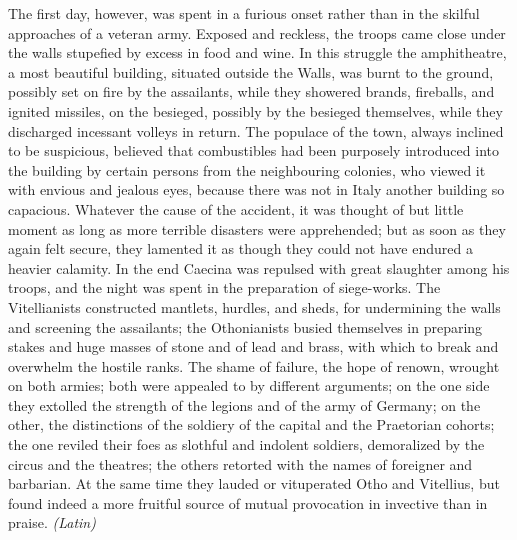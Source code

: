 
The first day, however, was spent in a furious onset rather than in the skilful approaches of a veteran army. Exposed and reckless, the troops came close under the walls stupefied by excess in food and wine. In this struggle the amphitheatre, a most beautiful building, situated outside the Walls, was burnt to the ground, possibly set on fire by the assailants, while they showered brands, fireballs, and ignited missiles, on the besieged, possibly by the besieged themselves, while they discharged incessant volleys in return. The populace of the town, always inclined to be suspicious, believed that combustibles had been purposely introduced into the building by certain persons from the neighbouring colonies, who viewed it with envious and jealous eyes, because there was not in Italy another building so capacious. Whatever the cause of the accident, it was thought of but little moment as long as more terrible disasters were apprehended; but as soon as they again felt secure, they lamented it as though they could not have endured a heavier calamity. In the end Caecina was repulsed with great slaughter among his troops, and the night was spent in the preparation of siege-works. The Vitellianists constructed mantlets, hurdles, and sheds, for undermining the walls and screening the assailants; the Othonianists busied themselves in preparing stakes and huge masses of stone and of lead and brass, with which to break and overwhelm the hostile ranks. The shame of failure, the hope of renown, wrought on both armies; both were appealed to by different arguments; on the one side they extolled the strength of the legions and of the army of Germany; on the other, the distinctions of the soldiery of the capital and the Praetorian cohorts; the one reviled their foes as slothful and indolent soldiers, demoralized by the circus and the theatres; the others retorted with the names of foreigner and barbarian. At the same time they lauded or vituperated Otho and Vitellius, but found indeed a more fruitful source of mutual provocation in invective than in praise. \emph{(Latin)}


